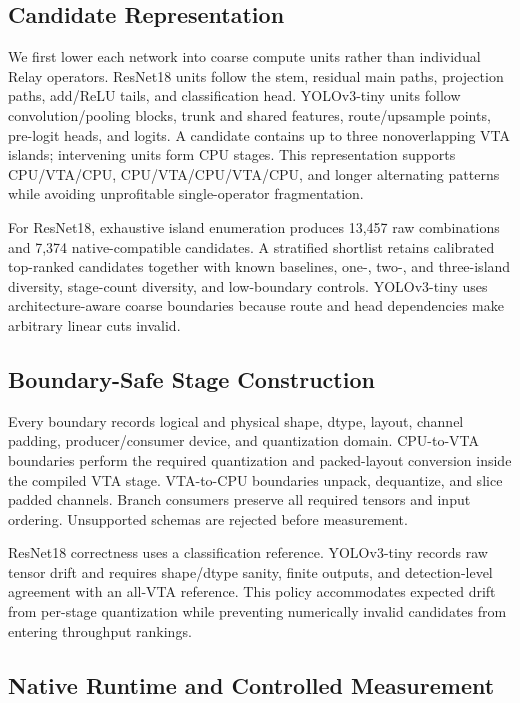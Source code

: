 \documentclass[conference]{IEEEtran}
\begin{document}
\subsection{Candidate Representation}

We first lower each network into coarse compute units rather than individual Relay operators. ResNet18 units follow the stem, residual main paths, projection paths, add/ReLU tails, and classification head. YOLOv3-tiny units follow convolution/pooling blocks, trunk and shared features, route/upsample points, pre-logit heads, and logits. A candidate contains up to three nonoverlapping VTA islands; intervening units form CPU stages. This representation supports CPU/VTA/CPU, CPU/VTA/CPU/VTA/CPU, and longer alternating patterns while avoiding unprofitable single-operator fragmentation.

For ResNet18, exhaustive island enumeration produces 13,457 raw combinations and 7,374 native-compatible candidates. A stratified shortlist retains calibrated top-ranked candidates together with known baselines, one-, two-, and three-island diversity, stage-count diversity, and low-boundary controls. YOLOv3-tiny uses architecture-aware coarse boundaries because route and head dependencies make arbitrary linear cuts invalid.

\subsection{Boundary-Safe Stage Construction}

Every boundary records logical and physical shape, dtype, layout, channel padding, producer/consumer device, and quantization domain. CPU-to-VTA boundaries perform the required quantization and packed-layout conversion inside the compiled VTA stage. VTA-to-CPU boundaries unpack, dequantize, and slice padded channels. Branch consumers preserve all required tensors and input ordering. Unsupported schemas are rejected before measurement.

ResNet18 correctness uses a classification reference. YOLOv3-tiny records raw tensor drift and requires shape/dtype sanity, finite outputs, and detection-level agreement with an all-VTA reference. This policy accommodates expected drift from per-stage quantization while preventing numerically invalid candidates from entering throughput rankings.

\subsection{Native Runtime and Controlled Measurement}
\end{document}
